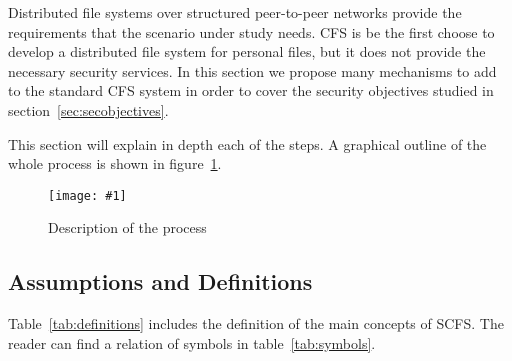 \documentclass{llncs}
\newcommand{\graphfigure}[3]{%
\begin{figure}[t]%
	\centering%
	\texttt{[image: \#1]}%
	\caption{#2}%
	\label{#3}%
\end{figure}%
}
\begin{document}
Distributed file systems over structured peer-to-peer networks provide the requirements that the scenario under study needs. CFS is be the first choose to develop a distributed file system for personal files, but it does not provide the necessary security services. In this section we propose many mechanisms to add to the standard CFS system in order to cover the security objectives studied in section~\ref{sec:secobjectives}.

This section will explain in depth each of the steps. A graphical outline of the whole process is shown in figure~\ref{fig:process}.

\graphfigure{process}{Description of the process}{fig:process}

\subsection{Assumptions and Definitions}
\label{sec:user}

Table~\ref{tab:definitions} includes the definition of the main concepts of SCFS. The reader can find a relation of symbols in table~\ref{tab:symbols}.
\end{document}
